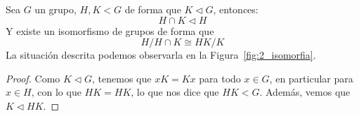 \begin{teo}\label{teo:2_isomorfia}
    Sea $G$ un grupo, $H,K<G$ de forma que $K\lhd G$, entonces:
    \begin{equation*}
        H\cap K \lhd H
    \end{equation*}
    Y existe un isomorfismo de grupos de forma que
    \begin{equation*}
        H/H\cap K \cong HK/K
    \end{equation*}
    La situación descrita podemos observarla en la Figura~\ref{fig:2_isomorfia}.
    \begin{proof}
        Como $K \lhd G$, tenemos que $xK=Kx$ para todo $x\in G$, en particular para $x\in H$, con lo que $HK = HK$, lo que nos dice que $HK < G$. Además, vemos que $K\lhd HK$. %


\end{proof}
\end{teo}
